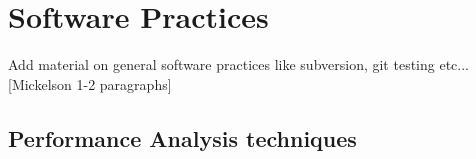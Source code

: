 \section{Software Practices}\label{sec:software}

{\color{red} Add material on general software practices like subversion, git testing etc... [Mickelson 1-2 paragraphs]}
 
 \subsection{Performance Analysis techniques}
 
 


